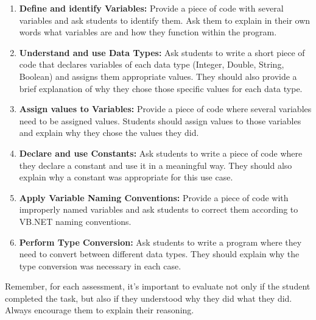 \documentclass[main.tex]{subfiles}
\begin{document}
\begin{enumerate}
  \item \textbf{Define and identify Variables:} Provide a piece of code with several variables and ask students to identify them. Ask them to explain in their own words what variables are and how they function within the program.

  \item \textbf{Understand and use Data Types:} Ask students to write a short piece of code that declares variables of each data type (Integer, Double, String, Boolean) and assigns them appropriate values. They should also provide a brief explanation of why they chose those specific values for each data type.

  \item \textbf{Assign values to Variables:} Provide a piece of code where several variables need to be assigned values. Students should assign values to those variables and explain why they chose the values they did.

  \item \textbf{Declare and use Constants:} Ask students to write a piece of code where they declare a constant and use it in a meaningful way. They should also explain why a constant was appropriate for this use case.

  \item \textbf{Apply Variable Naming Conventions:} Provide a piece of code with improperly named variables and ask students to correct them according to VB.NET naming conventions.

  \item \textbf{Perform Type Conversion:} Ask students to write a program where they need to convert between different data types. They should explain why the type conversion was necessary in each case.

\end{enumerate}

Remember, for each assessment, it's important to evaluate not only if the student completed the task, but also if they understood why they did what they did. Always encourage them to explain their reasoning.
\end{document}
